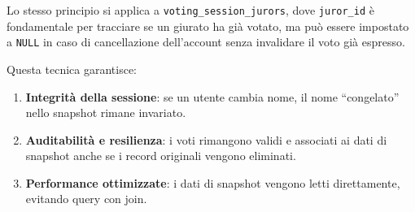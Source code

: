 Lo stesso principio si applica a \texttt{voting\_session\_jurors}, dove \texttt{juror\_id} è fondamentale per tracciare se un giurato ha già votato, ma può essere impostato a \texttt{NULL} in caso di cancellazione dell'account senza invalidare il voto già espresso.

Questa tecnica garantisce:
\begin{enumerate}
	\item \textbf{Integrità della sessione}: se un utente cambia nome, il nome ``congelato'' nello snapshot rimane invariato.
	\item \textbf{Auditabilità e resilienza}: i voti rimangono validi e associati ai dati di snapshot anche se i record originali vengono eliminati.
	\item \textbf{Performance ottimizzate}: i dati di snapshot vengono letti direttamente, evitando query con join.
\end{enumerate}

